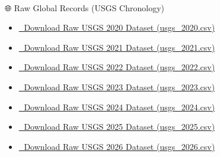 \documentclass[
  11pt,
  a4paper,
  DIV=11,
  numbers=noendperiod]{scrartcl}
\makeatletter
\let\oldparagraph\paragraph
\renewcommand{\paragraph}{
    \@ifstar
      \xxxParagraphStar
      \xxxParagraphNoStar
  }
\newcommand{\xxxParagraphStar}[1]{\oldparagraph*{#1}\mbox{}}
\newcommand{\xxxParagraphNoStar}[1]{\oldparagraph{#1}\mbox{}}
\providecommand{\tightlist}{%
  \setlength{\itemsep}{0pt}\setlength{\parskip}{0pt}}
\makeatother
\begin{document}
\paragraph{🌐 Raw Global Records (USGS
Chronology)}\label{raw-global-records-usgs-chronology}

\begin{itemize}
\tightlist
\item
  \href{data/usgs_2020.csv}{📄 Download Raw USGS 2020 Dataset
  (usgs\_2020.csv)}
\item
  \href{data/usgs_2021.csv}{📄 Download Raw USGS 2021 Dataset
  (usgs\_2021.csv)}
\item
  \href{data/usgs_2022.csv}{📄 Download Raw USGS 2022 Dataset
  (usgs\_2022.csv)}
\item
  \href{data/usgs_2023.csv}{📄 Download Raw USGS 2023 Dataset
  (usgs\_2023.csv)}
\item
  \href{data/usgs_2024.csv}{📄 Download Raw USGS 2024 Dataset
  (usgs\_2024.csv)}
\item
  \href{data/usgs_2025.csv}{📄 Download Raw USGS 2025 Dataset
  (usgs\_2025.csv)}
\item
  \href{data/usgs_2026.csv}{📄 Download Raw USGS 2026 Dataset
  (usgs\_2026.csv)}
\end{itemize}
\end{document}
